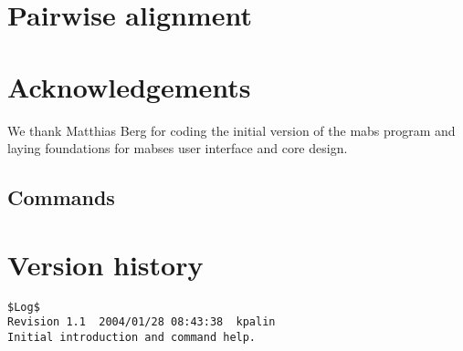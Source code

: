 \section{Pairwise alignment}
\label{sec:pairalign}




\section{Acknowledgements}
\label{sec:acknow}

We thank Matthias Berg for coding the initial version of the mabs
program and laying foundations for mabses user interface and core
design.





\appendix

\begin{landscape}
\section{Commands}
\label{sec:mabscommands}
\begin{small}
%
\end{small}
\end{landscape}


\section{Version history}
\begin{verbatim}
$Log$
Revision 1.1  2004/01/28 08:43:38  kpalin
Initial introduction and command help.

\end{verbatim}

